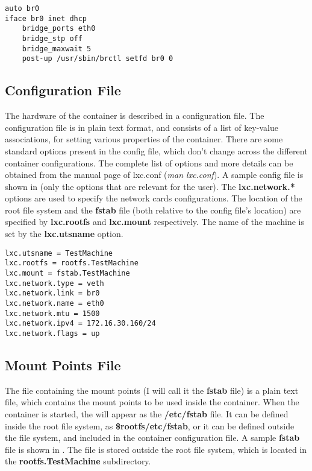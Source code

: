 \lstset{caption=Bridge configuration,label=lst:lxc-bridge-cfg}
\begin{lstlisting}
auto br0
iface br0 inet dhcp
	bridge_ports eth0
	bridge_stp off
	bridge_maxwait 5
	post-up /usr/sbin/brctl setfd br0 0
\end{lstlisting}

\subsection{Configuration File}
\label{sub-sec:lxc-config-file}
The hardware of the container is described in a configuration file. The
configuration file is in plain text format, and consists of a list of key-value
associations, for setting various properties of the container. There are some
standard options present in the config file, which don't change across the
different container configurations. The complete list of options and more
details can be obtained from the manual page of lxc.conf (\textit{man
lxc.conf}). A sample config file is shown in
 (only the options that are relevant for
the user). The \textbf{lxc.network.*} options are used to specify the network
cards configurations. The location of the root file system and the
\textbf{fstab} file (both relative to the config file's location) are specified
by \textbf{lxc.rootfs} and \textbf{lxc.mount} respectively. The name of the
machine is set by the \textbf{lxc.utsname} option.

\lstset{caption=Sample config file,label=lst:lxc-config}
\begin{lstlisting}
lxc.utsname = TestMachine
lxc.rootfs = rootfs.TestMachine
lxc.mount = fstab.TestMachine
lxc.network.type = veth
lxc.network.link = br0
lxc.network.name = eth0
lxc.network.mtu = 1500
lxc.network.ipv4 = 172.16.30.160/24
lxc.network.flags = up
\end{lstlisting}


\subsection{Mount Points File}
\label{sub-sec:lxc-fstab-file}
The file containing the mount points (I will call it the \textbf{fstab} file) is
a plain text file, which contains the mount points to be used inside the
container. When the container is started, the will appear as the
\textbf{/etc/fstab} file. It can be defined inside the root file system, as
\textbf{\$rootfs/etc/fstab}, or it can be defined outside the file system, and
included in the container configuration file. A sample \textbf{fstab} file is
shown in . The file is stored outside the
root file system, which is located in the \textbf{rootfs.TestMachine}
subdirectory.

